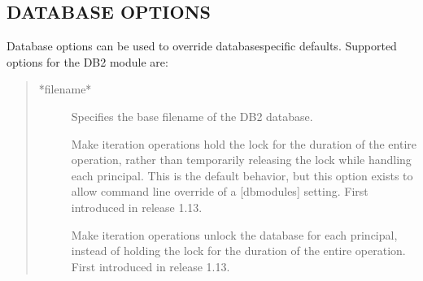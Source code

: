\documentclass[letterpaper,10pt,english]{sphinxmanual}
\begin{document}
\subsection{DATABASE OPTIONS}
\label{\detokenize{admin/admin_commands/kadmin_local:database-options}}\label{\detokenize{admin/admin_commands/kadmin_local:dboptions}}
\sphinxAtStartPar
Database options can be used to override database\sphinxhyphen{}specific defaults.
Supported options for the DB2 module are:
\begin{quote}
\begin{description}
\item[{*filename*}] \leavevmode
\sphinxAtStartPar
Specifies the base filename of the DB2 database.

\item[{}] \leavevmode
\sphinxAtStartPar
Make iteration operations hold the lock for the duration of
the entire operation, rather than temporarily releasing the
lock while handling each principal.  This is the default
behavior, but this option exists to allow command line
override of a {[}dbmodules{]} setting.  First introduced in
release 1.13.

\item[{}] \leavevmode
\sphinxAtStartPar
Make iteration operations unlock the database for each
principal, instead of holding the lock for the duration of the
entire operation.  First introduced in release 1.13.

\end{description}
\end{quote}
\end{document}
